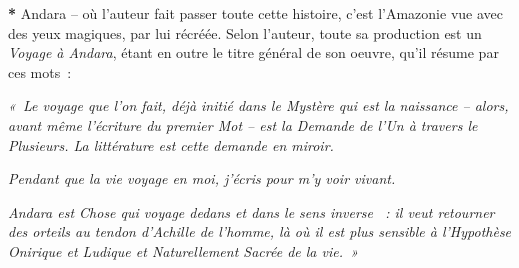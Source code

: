 \noindent{}\textbf{*} Andara -- où l'auteur fait passer toute cette histoire, c'est
l'Amazonie vue avec des yeux magiques, par lui récréée. Selon l'auteur,
toute sa production est un \emph{Voyage à Andara}, étant en outre le
titre général de son oeuvre, qu'il résume par ces mots~:

\noindent{}\emph{«~Le voyage que l'on fait, déjà initié dans le Mystère qui est la
naissance -- alors, avant même l'écriture du premier Mot -- est la
Demande de l'Un à travers le Plusieurs. La littérature est cette demande
en miroir.}

\noindent{}\emph{Pendant que la vie voyage en moi, j'écris pour m'y voir vivant.}

\noindent{}\emph{Andara est Chose qui voyage dedans et dans le sens inverse ~: il
veut retourner des orteils au tendon d'Achille de l'homme, là où il est
plus sensible à l'Hypothèse Onirique et Ludique et Naturellement Sacrée
de la vie.~»}
